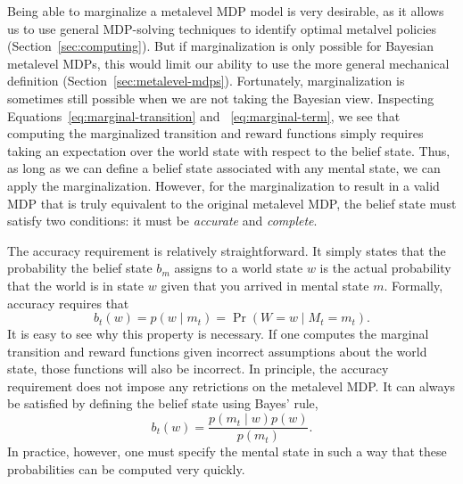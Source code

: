 Being able to marginalize a metalevel MDP model is very desirable, as it allows us to use general MDP-solving techniques to identify optimal metalvel policies (Section~\ref{sec:computing}). But if marginalization is only possible for Bayesian metalevel MDPs, this would limit our ability to use the more general mechanical definition (Section~\ref{sec:metalevel-mdps}). Fortunately, marginalization is sometimes still possible when we are not taking the Bayesian view. Inspecting Equations~\ref{eq:marginal-transition} and ~\ref{eq:marginal-term}, we see that computing the marginalized transition and reward functions simply requires taking an expectation over the world state with respect to the belief state. Thus, as long as we can define a belief state associated with any mental state, we can apply the marginalization. However, for the marginalization to result in a valid MDP that is truly equivalent to the original metalevel MDP, the belief state must satisfy two conditions: it must be \emph{accurate} and \emph{complete}.

The accuracy requirement is relatively straightforward. It simply states that the probability the belief state $b_m$ assigns to a world state $w$ is the actual probability that the world is in state $w$ given that you arrived in mental state $m$. Formally, accuracy requires that
\begin{equation}\label{eq:belief-accuracy}
  b_t(w) = p(w \mid m_t) = \Pr(W = w \mid M_t = m_t).
\end{equation}
It is easy to see why this property is necessary. If one computes the marginal transition and reward functions given incorrect assumptions about the world state, those functions will also be incorrect. In principle, the accuracy requirement does not impose any retrictions on the metalevel MDP. It can always be satisfied by defining the belief state using Bayes' rule,
\begin{equation}
  b_t(w) = \frac{p(m_t \mid w) p(w)}{p(m_t)}.
\end{equation}
In practice, however, one must specify the mental state in such a way that these probabilities can be computed very quickly.

